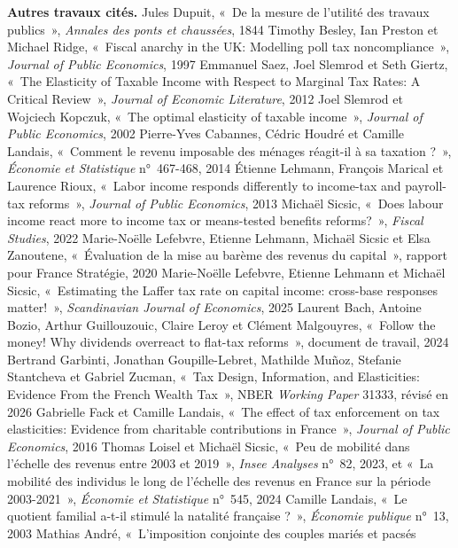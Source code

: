 \documentclass[11pt,a4paper]{article}
\begin{document}
{\textbf{Autres travaux cités.} Jules Dupuit, «~De la mesure de l'utilité des travaux publics~»,
\emph{Annales des ponts et chaussées}, 1844 \textbullet{} Timothy Besley, Ian Preston et Michael
Ridge, «~Fiscal anarchy in the UK: Modelling poll tax noncompliance~», \emph{Journal of Public
Economics}, 1997 \textbullet{} Emmanuel Saez, Joel Slemrod et Seth Giertz, «~The Elasticity of
Taxable Income with Respect to Marginal Tax Rates: A Critical Review~», \emph{Journal of Economic
Literature}, 2012 \textbullet{} Joel Slemrod et Wojciech Kopczuk, «~The optimal elasticity of
taxable income~», \emph{Journal of Public Economics}, 2002 \textbullet{} Pierre-Yves Cabannes,
Cédric Houdré et Camille Landais, «~Comment le revenu imposable des ménages réagit-il à sa
taxation ?~», \emph{Économie et Statistique} n°~467-468, 2014 \textbullet{} Étienne Lehmann,
François Marical et Laurence Rioux, «~Labor income responds differently to income-tax and
payroll-tax reforms~», \emph{Journal of Public Economics}, 2013 \textbullet{} Michaël Sicsic, «~Does
labour income react more to income tax or means-tested benefits reforms?~», \emph{Fiscal Studies},
2022 \textbullet{} Marie-Noëlle Lefebvre, Etienne Lehmann, Michaël Sicsic et Elsa Zanoutene,
«~Évaluation de la mise au barème des revenus du capital~», rapport pour France Stratégie, 2020
\textbullet{} Marie-Noëlle Lefebvre, Etienne Lehmann et Michaël Sicsic, «~Estimating the Laffer
tax rate on capital income: cross-base responses matter!~», \emph{Scandinavian Journal of
Economics}, 2025 \textbullet{} Laurent Bach, Antoine Bozio, Arthur Guillouzouic, Claire Leroy et Clément
Malgouyres, «~Follow the money! Why dividends overreact to flat-tax reforms~», document de travail,
2024 \textbullet{} Bertrand Garbinti, Jonathan Goupille-Lebret, Mathilde Muñoz, Stefanie Stantcheva
et Gabriel Zucman, «~Tax Design, Information, and Elasticities: Evidence From the French Wealth
Tax~», NBER \emph{Working Paper} 31333, révisé en 2026 \textbullet{} Gabrielle Fack et Camille
Landais, «~The effect of tax enforcement on tax elasticities: Evidence from charitable contributions
in France~», \emph{Journal of Public Economics}, 2016 \textbullet{} Thomas Loisel et
Michaël Sicsic, «~Peu de mobilité dans l'échelle des revenus entre 2003 et 2019~», \emph{Insee
Analyses} n°~82, 2023, et «~La mobilité des individus le long de l'échelle des revenus en France
sur la période 2003-2021~», \emph{Économie et Statistique} n°~545, 2024 \textbullet{} Camille
Landais, «~Le quotient familial a-t-il stimulé la natalité française ?~», \emph{Économie publique}
n°~13, 2003 \textbullet{} Mathias André, «~L'imposition conjointe des couples mariés et pacsés
}
\end{document}
